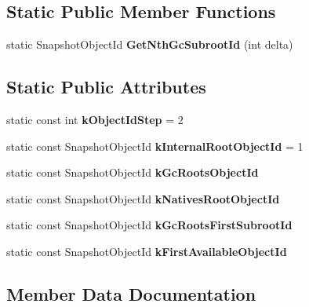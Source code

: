 \subsection*{Static Public Member Functions}
\begin{DoxyCompactItemize}
\item 
\hypertarget{classv8_1_1internal_1_1_heap_objects_map_a78c61d0ce669d861cce8dd2660c91840}{}static Snapshot\+Object\+Id {\bfseries Get\+Nth\+Gc\+Subroot\+Id} (int delta)\label{classv8_1_1internal_1_1_heap_objects_map_a78c61d0ce669d861cce8dd2660c91840}

\end{DoxyCompactItemize}
\subsection*{Static Public Attributes}
\begin{DoxyCompactItemize}
\item 
\hypertarget{classv8_1_1internal_1_1_heap_objects_map_a11bef81d3f530538f97fc8dd362d2e2d}{}static const int {\bfseries k\+Object\+Id\+Step} = 2\label{classv8_1_1internal_1_1_heap_objects_map_a11bef81d3f530538f97fc8dd362d2e2d}

\item 
\hypertarget{classv8_1_1internal_1_1_heap_objects_map_a04fba906564af1ded2c829fe22b0f6d0}{}static const Snapshot\+Object\+Id {\bfseries k\+Internal\+Root\+Object\+Id} = 1\label{classv8_1_1internal_1_1_heap_objects_map_a04fba906564af1ded2c829fe22b0f6d0}

\item 
static const Snapshot\+Object\+Id {\bfseries k\+Gc\+Roots\+Object\+Id}
\item 
\hypertarget{classv8_1_1internal_1_1_heap_objects_map_a67cf55898a439febc464af8e097bb8b8}{}static const Snapshot\+Object\+Id {\bfseries k\+Natives\+Root\+Object\+Id}\label{classv8_1_1internal_1_1_heap_objects_map_a67cf55898a439febc464af8e097bb8b8}

\item 
static const Snapshot\+Object\+Id {\bfseries k\+Gc\+Roots\+First\+Subroot\+Id}
\item 
static const Snapshot\+Object\+Id {\bfseries k\+First\+Available\+Object\+Id}
\end{DoxyCompactItemize}


\subsection{Member Data Documentation}
\hypertarget{classv8_1_1internal_1_1_heap_objects_map_a0424e15b8207599ea3fae3c69eb0fa26}{}
